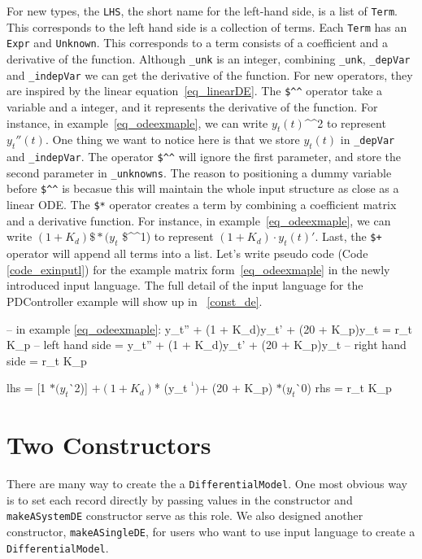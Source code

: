 For new types, the \verb|LHS|, the short name for the left-hand side, is a list of \verb|Term|. This corresponds to the left hand side is a collection of terms. Each \verb|Term| has an \verb|Expr| and \verb|Unknown|. This corresponds to a term consists of a coefficient and a derivative of the function. Although \verb|_unk| is an integer, combining \verb|_unk|, \verb|_depVar| and \verb|_indepVar| we can get the derivative of the function. For new operators, they are inspired by the linear equation~\ref{eq_linearDE}. The \verb|$^^| operator take a variable and a integer, and it represents the derivative of the function. For instance, in example~\ref{eq_odeexmaple}, we can write $y_t(t)$\^{}\^{}2 to represent $y_t''(t)$. One thing we want to notice here is that we store $y_t(t)$ in \verb|_depVar| and \verb|_indepVar|. The operator \verb|$^^| will ignore the first parameter, and store the second parameter in \verb|_unknowns|. The reason to positioning a dummy variable before \verb|$^^| is becasue this will maintain the whole input structure as close as a linear ODE. The \verb|$*| operator creates a term by combining a coefficient matrix and a derivative function. For instance, in example~\ref{eq_odeexmaple}, we can write $(1 + K_d) \$* (y_t$ \$\^{}\^{}1) to represent $(1 + K_d) \cdot y_t(t)'$. Last, the \verb|$+| operator will append all terms into a list. Let's write pseudo code (Code \ref{code_exinputl}) for the example matrix form~\ref{eq_odeexmaple} in the newly introduced input language. The full detail of the input language for the PDController example will show up in ~\ref{const_de}.

\begin{listing}[ht]
\begin{haskell1}
-- in example \ref{eq_odeexmaple}: y\_t'' + (1 + K\_d)y\_t' + (20 + K\_p)y\_t = r\_t K\_p
-- left hand side = y\_t'' + (1 + K\_d)y\_t' + (20 + K\_p)y\_t 
-- right hand side = r\_t K\_p

lhs = [1 $* (y_t $^^ 2)]
	$+ (1 + K_d) $* (y_t $^^ 1)
	$+ (20 + K_p) $* (y_t $^^ 0)
rhs = r_t K_p
\end{haskell1}
\label{code_exinputl}
\end{listing}

\section{Two Constructors}
There are many way to create the a \verb|DifferentialModel|. One most obvious way is to set each record directly by passing values in the constructor and \verb|makeASystemDE| constructor serve as this role. We also designed another constructor, \verb|makeASingleDE|, for users who want to use input language to create a \verb|DifferentialModel|.

